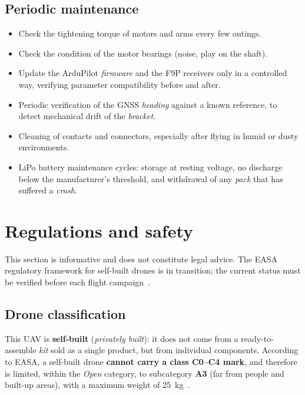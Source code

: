 \subsection{Periodic maintenance}
\begin{itemize}
    \item Check the tightening torque of motors and arms every few outings.
    \item Check the condition of the motor bearings (noise, play on the shaft).
    \item Update the ArduPilot \emph{firmware} and the F9P receivers only in a controlled way, verifying parameter compatibility before and after.
    \item Periodic verification of the GNSS \emph{heading} against a known reference, to detect mechanical drift of the \emph{bracket}.
    \item Cleaning of contacts and connectors, especially after flying in humid or dusty environments.
    \item LiPo battery maintenance cycles: storage at resting voltage, no discharge below the manufacturer's threshold, and withdrawal of any \emph{pack} that has suffered a \emph{crash}.
\end{itemize}

\section{Regulations and safety}
\label{sec:normativa}

This section is informative and does not constitute legal advice. The EASA regulatory framework for self-built drones is in transition; the current status must be verified before each flight campaign~\cite{easa_open_category}.

\subsection{Drone classification}

This UAV is \textbf{self-built} (\emph{privately built}): it does not come from a ready-to-assemble \emph{kit} sold as a single product, but from individual components. According to EASA, a self-built drone \textbf{cannot carry a class C0--C4 mark}, and therefore is limited, within the \emph{Open} category, to subcategory \textbf{A3} (far from people and built-up areas), with a maximum weight of 25~kg~\cite{easa_open_category}.

